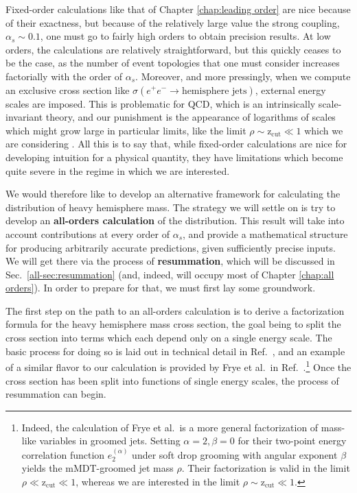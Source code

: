 \documentclass[../thesis.tex]{subfiles}
\providecommand{\zcut}{\mathrm{z_{cut}}}
\begin{document}
	Fixed-order calculations like that of Chapter \ref{chap:leading order} are nice because of their exactness, but because of the relatively large value the strong coupling, $\alpha_s \sim 0.1$, one must go to fairly high orders to obtain precision results. At low orders, the calculations are relatively straightforward, but this quickly ceases to be the case, as the number of event topologies that one must consider increases factorially with the order of $\alpha_s$. Moreover, and more pressingly, when we compute an exclusive cross section like $\sigma(e^+ e^- \to \text{hemisphere jets})$, external energy scales are imposed. This is problematic for QCD, which is an intrinsically scale-invariant theory, and our punishment is the appearance of logarithms of scales which might grow large in particular limits, like the limit $\rho \sim \zcut \ll 1$ which we are considering \cite{larkoski_elementary_2019-1}. All this is to say that, while fixed-order calculations are nice for developing intuition for a physical quantity, they have limitations which become quite severe in the regime in which we are interested.

	We would therefore like to develop an alternative framework for calculating the distribution of heavy hemisphere mass. The strategy we will settle on is try to develop an \textbf{all-orders calculation} of the distribution. This result will take into account contributions at every order of $\alpha_s$, and provide a mathematical structure for producing arbitrarily accurate predictions, given sufficiently precise inputs. We will get there via the process of \textbf{resummation}, which will be discussed in Sec.~\ref{all-sec:resummation} (and, indeed, will occupy most of Chapter \ref{chap:all orders}). In order to prepare for that, we must first lay some groundwork.

	The first step on the path to an all-orders calculation is to derive a factorization formula for the heavy hemisphere mass cross section, the goal being to split the cross section into terms which each depend only on a single energy scale. The basic process for doing so is laid out in technical detail in Ref.~\cite{becher_introduction_2015-1}, and an example of a similar flavor to our calculation is provided by Frye et al.\ in Ref.~\cite{frye_factorization_2016}.\footnote{Indeed, the calculation of Frye et al.\ is a more general factorization of mass-like variables in groomed jets. Setting $\alpha = 2, \beta = 0$ for their two-point energy correlation function $e_2^{(\alpha)}$ under soft drop grooming with angular exponent $\beta$ yields the mMDT-groomed jet mass $\rho$. Their factorization is valid in the limit $\rho \ll \zcut \ll 1$, whereas we are interested in the limit $\rho \sim \zcut \ll 1$.} Once the cross section has been split into functions of single energy scales, the process of resummation can begin. 
\end{document}
